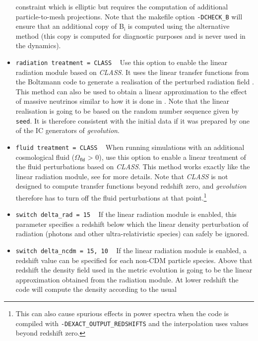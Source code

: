 \documentclass[a4paper,10pt]{article}
\begin{document}
\begin{itemize}
 constraint which is elliptic but requires the computation of additional particle-to-mesh projections. Note that the makefile option
 \texttt{-DCHECK\_B} will ensure that an additional copy of B$_\mathsf{i}$ is computed using the alternative method (this copy is computed
 for diagnostic purposes and is never used in the dynamics).
 \item[] \hspace{-25pt}\texttt{radiation treatment = CLASS} ~ Use this option to enable the linear radiation module based on \textit{CLASS}.
 It uses the linear transfer functions from the Boltzmann code to generate a realisation of the perturbed radiation field \cite{Adamek:2017grt}.
 This method can also be used to obtain a linear approximation to the effect of massive neutrinos similar to how it is done in \cite{Brandbyge:2008js}.
 Note that the linear realisation is going to be based on the random number sequence given
 by \texttt{seed}. It is therefore consistent with the initial data if it was prepared by one of the IC generators of \textit{gevolution}.
 \item[] \hspace{-25pt}\texttt{fluid treatment = CLASS} ~ When running simulations with an additional cosmological fluid ($\mathsf{\Omega}_\mathsf{fld}$ > 0),
 use this option to enable a linear treatment of the fluid perturbations based on \textit{CLASS}. This method works exactly like the linear radiation module, see
 \cite{Hassani:2019lmy} for more details. Note that \textit{CLASS} is not designed to compute transfer functions beyond redshift zero, and
 \textit{gevolution} therefore has to turn off the fluid perturbations at that point.\footnote{This can also cause spurious effects in power spectra
 when the code is compiled with \texttt{-DEXACT\_OUTPUT\_REDSHIFTS} and the interpolation uses values beyond redshift zero.}
 \item[] \hspace{-25pt}\texttt{switch delta\_rad = 15} ~ If the linear radiation module is enabled, this parameter specifies a
 redshift below which the linear density perturbation of radiation (photons and other ultra-relativistic species) can safely be ignored.
 \item[] \hspace{-25pt}\texttt{switch delta\_ncdm = 15, 10} ~ If the linear radiation module is enabled, a redshift value can be specified
 for each non-CDM particle species. Above that redshift the density field used in the metric evolution is going to be the linear
 approximation obtained from the radiation module. At lower redshift the code will compute the density according to the usual

\end{itemize}
\end{document}
